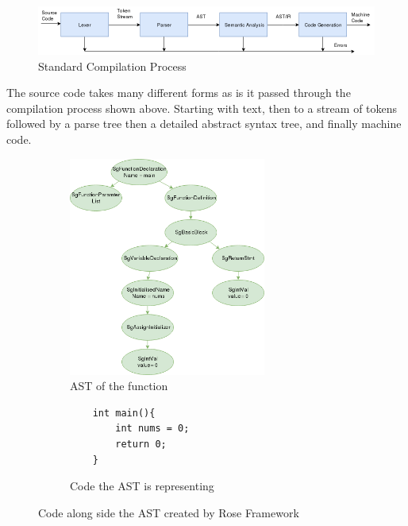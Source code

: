 \documentclass[bsc,frontabs,singlespacing,twoside,parskip,deptreport]{infthesis}
\begin{document}
\begin{figure}[!h]
    \centering
    \includegraphics[width=\textwidth]{images/Compilation-process.png}
    \caption{Standard Compilation Process}
    \label{fig:comp_proc}
\end{figure}
The source code takes many different forms as is it passed through the compilation process shown above. Starting with text, then to a stream of tokens followed by a parse tree then a detailed abstract syntax tree, and finally machine code. 

\begin{figure}[H]
    \begin{subfigure}[b]{0.5\textwidth}
        \centering
        \includegraphics[height=7.2cm]{images/ast-example.png}
        \caption{AST of the function}
        \label{fig:ast-example-AST}
    \end{subfigure}
    \hfill
    \begin{subfigure}[b]{0.5\textwidth}
        \centering
        \begin{verbatim}
    int main(){
        int nums = 0;
        return 0;
    }
        \end{verbatim}
        \caption{Code the AST is representing}
        \label{fig:ast-example-code}
    \end{subfigure}
    \vspace{-0.5cm}
    \caption{Code along side the AST created by Rose Framework }
    \label{fig:ast-example}
\end{figure}
\end{document}
